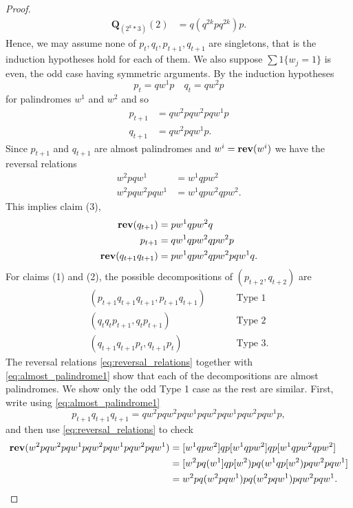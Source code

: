 \documentclass[12pt]{amsart}
\begin{document}
\begin{proof}
\[\begin{aligned}
	\mathbf{Q}_{(2^k*3)}(2) &= q (q^{2 k} p q^{2k}) p.
	\end{aligned}
	\]
	Hence, we may assume none of $p_t,q_t, p_{t+1}, q_{t+1}$ are singletons, that is the induction hypotheses hold for each of them.
	We also suppose $\sum 1\{w_j = 1\}$ is even, the odd case having symmetric arguments. By the induction hypotheses
	\[
	p_t = q w^{1} p \quad q_t = q w^2 p  
	\]
	for palindromes $w^1$ and $w^2$ and so
	\begin{equation} \label{eq:almost_palindrome1}
	\begin{aligned}
	p_{t+1} &=  q w^2 p q w^2 p q w^1 p  \\ %
	q_{t+1} &=  q w^2 p q w^1 p.  %
	\end{aligned}
	\end{equation}
	Since $p_{t+1}$ and $q_{t+1}$ are almost palindromes and $w^i = \mathop{\bf rev}(w^i)$ we have the reversal relations 
	\begin{equation} \label{eq:reversal_relations}
	\begin{aligned}
	w^2 p q w^1 &= w^1 q p w^2 \\%
	w^2 p q w^2 p q w^1 &=  w^1 q p w^2 q p w^2. %
	\end{aligned}
	\end{equation}
	This implies claim (3),
	\begin{align*}
	\mathop{\bf rev}(q_{t+1}) &= p w^1 q p w^2 q \\
		p_{t+1} &= q w^1 q p w^2 q p w^2 p \\
		\mathop{\bf rev}(q_{t+1} q_{t+1}) &= p w^1 q p w^2 q p w^2 p q w^1 q.
	\end{align*}
	For claims (1) and (2),  the possible decompositions of $(p_{t+2}, q_{t+2})$ are 
	\begin{align*}
	( p_{t+1} q_{t+1} q_{t+1}, p_{t+1} q_{t+1})  \qquad &\mbox{ Type 1} \\
	(q_{t} q_{t} p_{t+1}, q_{t} p_{t+1})  \qquad &\mbox{ Type 2} \\
	(q_{t+1} q_{t+1} p_{t}, q_{t+1} p_{t})  \qquad &\mbox{ Type 3}.
	\end{align*}
	The reversal relations \eqref{eq:reversal_relations} together with \eqref{eq:almost_palindrome1} 
	show that each of the decompositions are almost palindromes. We show only the odd Type 1 case 
	as the rest are similar. First, write using \eqref{eq:almost_palindrome1} 
	\[
	p_{t+1} q_{t+1} q_{t+1} =  q w^2 p q w^2 p q w^1 p q w^2 p q w^1 p q w^2 p q w^1 p,
	\]
	and then use \eqref{eq:reversal_relations} to check 
	\begin{align*}
	\mathop{\bf rev}(w^2 p q w^2 p q w^1 p q w^2 p q w^1 p q w^2 p q w^1) &= [w^1 q p w^2] q p [w^1 q p w^2] q p [w^1 q p w^2 q p w^2] \\
	&=   	[w^2 p q (w^1] q p 	[w^2) p q (w^1 q p [ w^2) p q w^2 p q w^1] \\
	&=  w^2 p q (w^2 p q w^1) p q (w^2 p q  w^1) p q w^2 p q w^1.
	\end{align*}
\end{proof}
\end{document}
